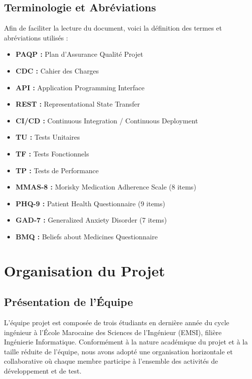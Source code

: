 \documentclass[12pt,a4paper]{report}
\begin{document}
\section{Terminologie et Abréviations}

Afin de faciliter la lecture du document, voici la définition des termes et abréviations utilisés :

\begin{itemize}
    \item \textbf{PAQP :} Plan d'Assurance Qualité Projet
    \item \textbf{CDC :} Cahier des Charges
    \item \textbf{API :} Application Programming Interface
    \item \textbf{REST :} Representational State Transfer
    \item \textbf{CI/CD :} Continuous Integration / Continuous Deployment
    \item \textbf{TU :} Tests Unitaires
    \item \textbf{TF :} Tests Fonctionnels
    \item \textbf{TP :} Tests de Performance
    \item \textbf{MMAS-8 :} Morisky Medication Adherence Scale (8 items)
    \item \textbf{PHQ-9 :} Patient Health Questionnaire (9 items)
    \item \textbf{GAD-7 :} Generalized Anxiety Disorder (7 items)
    \item \textbf{BMQ :} Beliefs about Medicines Questionnaire
\end{itemize}

\newpage

\chapter{Organisation du Projet}

\section{Présentation de l'Équipe}

L'équipe projet est composée de trois étudiants en dernière année du cycle ingénieur à l'École Marocaine des Sciences de l'Ingénieur (EMSI), filière Ingénierie Informatique. Conformément à la nature académique du projet et à la taille réduite de l'équipe, nous avons adopté une organisation horizontale et collaborative où chaque membre participe à l'ensemble des activités de développement et de test.
\end{document}
